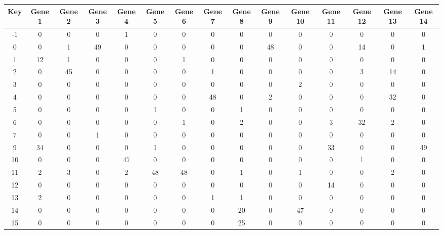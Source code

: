 \begin{tabular}{|c|c|c|c|c|c|c|c|c|c|c|c|c|c|c|}
\hline
Key & Gene 1 & Gene 2 & Gene 3 & Gene 4 & Gene 5 & Gene 6 & Gene 7 & Gene 8 & Gene 9 & Gene 10 & Gene 11 & Gene 12 & Gene 13 & Gene 14 \\
\hline
-1 & 0 & 0 & 0 & 1 & 0 & 0 & 0 & 0 & 0 & 0 & 0 & 0 & 0 & 0 \\
0 & 0 & 1 & 49 & 0 & 0 & 0 & 0 & 0 & 48 & 0 & 0 & 14 & 0 & 1 \\
1 & 12 & 1 & 0 & 0 & 0 & 1 & 0 & 0 & 0 & 0 & 0 & 0 & 0 & 0 \\
2 & 0 & 45 & 0 & 0 & 0 & 0 & 1 & 0 & 0 & 0 & 0 & 3 & 14 & 0 \\
3 & 0 & 0 & 0 & 0 & 0 & 0 & 0 & 0 & 0 & 2 & 0 & 0 & 0 & 0 \\
4 & 0 & 0 & 0 & 0 & 0 & 0 & 48 & 0 & 2 & 0 & 0 & 0 & 32 & 0 \\
5 & 0 & 0 & 0 & 0 & 1 & 0 & 0 & 1 & 0 & 0 & 0 & 0 & 0 & 0 \\
6 & 0 & 0 & 0 & 0 & 0 & 1 & 0 & 2 & 0 & 0 & 3 & 32 & 2 & 0 \\
7 & 0 & 0 & 1 & 0 & 0 & 0 & 0 & 0 & 0 & 0 & 0 & 0 & 0 & 0 \\
9 & 34 & 0 & 0 & 0 & 1 & 0 & 0 & 0 & 0 & 0 & 33 & 0 & 0 & 49 \\
10 & 0 & 0 & 0 & 47 & 0 & 0 & 0 & 0 & 0 & 0 & 0 & 1 & 0 & 0 \\
11 & 2 & 3 & 0 & 2 & 48 & 48 & 0 & 1 & 0 & 1 & 0 & 0 & 2 & 0 \\
12 & 0 & 0 & 0 & 0 & 0 & 0 & 0 & 0 & 0 & 0 & 14 & 0 & 0 & 0 \\
13 & 2 & 0 & 0 & 0 & 0 & 0 & 1 & 1 & 0 & 0 & 0 & 0 & 0 & 0 \\
14 & 0 & 0 & 0 & 0 & 0 & 0 & 0 & 20 & 0 & 47 & 0 & 0 & 0 & 0 \\
15 & 0 & 0 & 0 & 0 & 0 & 0 & 0 & 25 & 0 & 0 & 0 & 0 & 0 & 0 \\
\hline
\end{tabular}